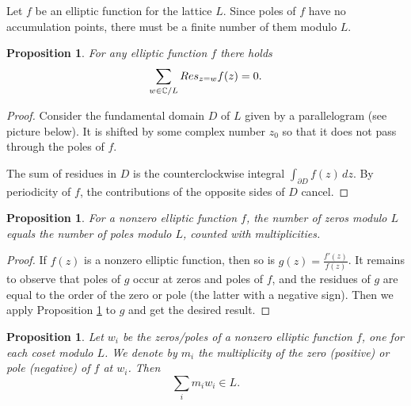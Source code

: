 \documentclass[11pt]{article}
\numberwithin{equation}{section}
\numberwithin{footnote}{section}
\newtheorem{prop}[thm]{Proposition}
\newcommand{\C}{{\mathbb C}}
\begin{document}
\smallskip
Let $f$ be an elliptic function for the lattice $L$. Since poles of $f$ have no accumulation points, there must be a finite number of them modulo $L$. 

\smallskip
\begin{prop}\label{sumres}
For any elliptic function $f$ there holds
$$
\sum_{w\in \C/L} {\rm Res}_{z=w} f(z) = 0.
$$
\end{prop}

\begin{proof}
Consider the fundamental domain $D$ of $L$ given by a parallelogram (see picture below). It is shifted by some complex number $z_0$ so that it does not pass through the poles of $f$.


\noindent
The sum of residues in $D$ is the counterclockwise integral $\int_{\partial D} f(z)\,dz$. By periodicity of $f$, the contributions of the opposite sides of $D$ cancel.
\end{proof}

\begin{prop}\label{zp}
For a nonzero elliptic function $f$, the number of zeros modulo $L$ equals the number of poles modulo $L$, counted with multiplicities.
\end{prop}

\begin{proof}
If $f(z)$ is a nonzero elliptic function, then so is $g(z) = \frac {f'(z)}{f(z)}$. It remains to observe that poles of $g$ occur at zeros and poles of $f$, and the residues of $g$ are equal to the order of the zero or pole (the latter with a negative sign). Then we apply Proposition \ref{sumres} to $g$ and get the desired result. 
\end{proof}

\begin{prop}\label{sumzerospoles}
Let $w_i$ be the zeros/poles of a nonzero elliptic function $f$, one for each coset modulo $L$. We denote by $m_i$ the multiplicity of the zero (positive) or pole (negative) of $f$ at $w_i$. Then
\begin{equation}\label{sum}
\sum_{i} m_i w_i \in L.
\end{equation}
\end{prop}
\end{document}
